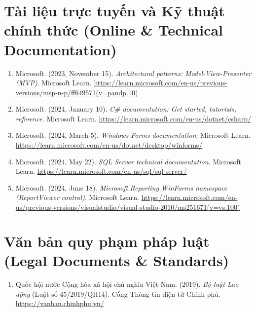 \documentclass[12pt,a4paper]{report}
\begin{document}
\section*{Tài liệu trực tuyến và Kỹ thuật chính thức (Online \& Technical Documentation)}
\begin{enumerate}[resume, leftmargin=1.0cm]
    \item Microsoft. (2023, November 15). \textit{Architectural patterns: Model-View-Presenter (MVP)}. Microsoft Learn. \url{https://learn.microsoft.com/en-us/previous-versions/msp-n-p/ff649571(v=pandp.10)}
    \item Microsoft. (2024, January 10). \textit{C\# documentation: Get started, tutorials, reference}. Microsoft Learn. \url{https://learn.microsoft.com/en-us/dotnet/csharp/}
    \item Microsoft. (2024, March 5). \textit{Windows Forms documentation}. Microsoft Learn. \url{https://learn.microsoft.com/en-us/dotnet/desktop/winforms/}
    \item Microsoft. (2024, May 22). \textit{SQL Server technical documentation}. Microsoft Learn. \url{https://learn.microsoft.com/en-us/sql/sql-server/}
    \item Microsoft. (2024, June 18). \textit{Microsoft.Reporting.WinForms namespace (ReportViewer control)}. Microsoft Learn. \url{https://learn.microsoft.com/en-us/previous-versions/visualstudio/visual-studio-2010/ms251671(v=vs.100)}
\end{enumerate}

\section*{Văn bản quy phạm pháp luật (Legal Documents \& Standards)}
\begin{enumerate}[resume, leftmargin=1.0cm]
    \item Quốc hội nước Cộng hòa xã hội chủ nghĩa Việt Nam. (2019). \textit{Bộ luật Lao động} (Luật số 45/2019/QH14). Cổng Thông tin điện tử Chính phủ. \url{https://vanban.chinhphu.vn/}
\end{enumerate}
\end{document}
